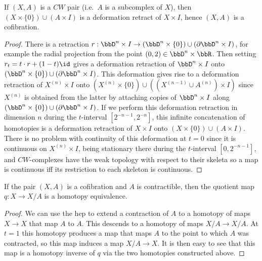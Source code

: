 \begin{prop}\label{prop 0.16 Hatcher}
    If $(X,A)$ is a $CW$ pair (i.e.~$A$ is a subcomplex of $X$), then $(X\times\{0\})\cup (A\times I)$ is a deformation retract of $X\times I$, hence $(X,A)$ is a cofibration.
\end{prop}
\begin{proof}
    There is a retraction $r:\bbD^n\times I\to (\bbD^n\times\{0\})\cup (\partial \bbD^n\times I)$, for example the radial projection from the point $(0,2)\in \bbD^n\times \bbR$. Then setting $r_t=t\cdot r+(1-t)\id$ gives a deformation retraction of $\bbD^n\times I$ onto $(\bbD^n\times\{0\})\cup (\partial \bbD^n\times I)$. This deformation gives rise to a deformation retraction of $X^{(n)}\times I$ onto $(X^{(n)}\times\{0\})\cup ((X^{(n-1)}\cup A^{(n)})\times I)$ since $X^{(n)}$ is obtained from the latter by attaching copies of $\bbD^n\times I$ along $(\bbD^n\times\{0\})\cup (\partial \bbD^n\times I)$. If we perform this deformation retraction in dimension $n$ during the $t$-interval $[2^{-n-1},2^{-n}]$, this infinite concatenation of homotopies is a deformation retraction of $X\times I$ onto $(X\times\{0\})\cup (A\times I)$. There is no problem with continuity of this deformation at $t=0$ since it is continuous on $X^{(n)}\times I$, being stationary there during the $t$-interval $[0,2^{-n-1}]$, and $CW$-complexes have the weak topology with respect to their skeleta so a map is continuous iff its restriction to each skeleton is continuous.
\end{proof}

\begin{prop}
    If the pair $(X,A)$ is a cofibration and $A$ is contractible, then the quotient map $q:X\to X\slash A$ is a homotopy equivalence.
\end{prop}
\begin{proof}
    We can use the \gls{hep} to extend a contraction of $A$ to a homotopy of maps $X\to X$ that map $A$ to $A$. This descends to a homotopy of maps $X\slash A\to X\slash A$. At $t=1$ this homotopy produces a map that maps $A$ to the point to which $A$ was contracted, so this map induces a map $X\slash A\to X$. It is then easy to see that this map is a homotopy inverse of $q$ via the two homotopies constructed above.
\end{proof}

